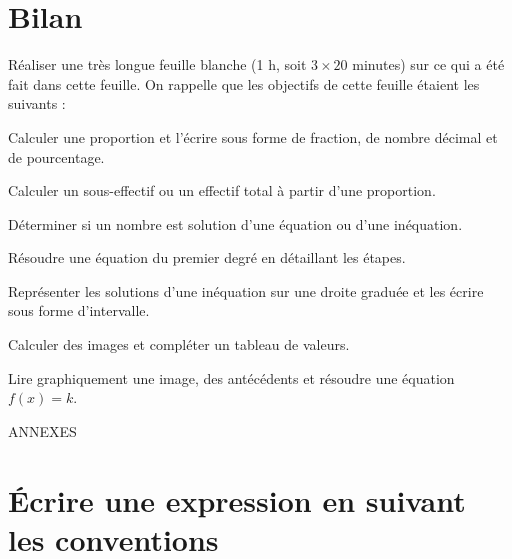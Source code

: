 \documentclass[10pt,a4paper]{article}
\begin{document}
\section{Bilan}

Réaliser une très longue feuille blanche (1 h, soit \(3\times 20\) minutes) sur ce qui a été fait dans cette feuille. On rappelle que les objectifs de cette feuille étaient les suivants :

\medskip

Calculer une proportion et l'écrire sous forme de fraction, de nombre décimal et de pourcentage.\par\smallskip
Calculer un sous-effectif ou un effectif total à partir d'une proportion.\par\smallskip
Déterminer si un nombre est solution d'une équation ou d'une inéquation.\par\smallskip
Résoudre une équation du premier degré en détaillant les étapes.\par\smallskip
Représenter les solutions d'une inéquation sur une droite graduée et les écrire sous forme d'intervalle.\par\smallskip
Calculer des images et compléter un tableau de valeurs.\par\smallskip
Lire graphiquement une image, des antécédents et résoudre une équation \(f(x)=k\).



\newpage

\begin{center}
    \Huge ANNEXES
\end{center}

\appendix

\section{Écrire une expression en suivant les conventions} \label{annexe-expr-mult}
\end{document}
